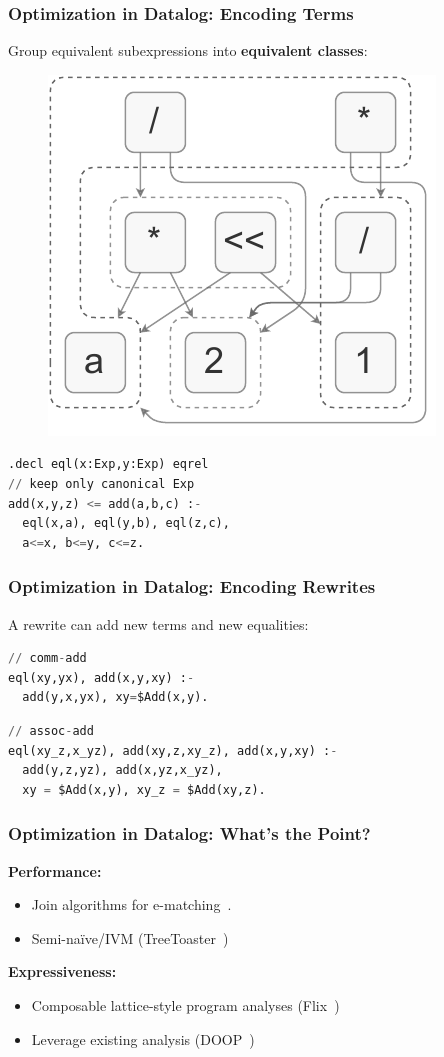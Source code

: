 \documentclass{beamer}
\begin{document}
\begin{frame}[fragile]
    \frametitle{Optimization in Datalog: Encoding Terms}
    Group equivalent subexpressions into \textbf{equivalent classes}:
    \begin{figure}
        \includegraphics[height=0.4\textheight]{egraph4.pdf}
    \end{figure}
    \pause
    \begin{lstlisting}[language=Python]
.decl eql(x:Exp,y:Exp) eqrel
// keep only canonical Exp
add(x,y,z) <= add(a,b,c) :-
  eql(x,a), eql(y,b), eql(z,c),
  a<=x, b<=y, c<=z.
    \end{lstlisting}
\end{frame}

\begin{frame}[fragile]
    \frametitle{Optimization in Datalog: Encoding Rewrites}
     A rewrite can add new terms and new equalities:

     \begin{lstlisting}[language=Python]
// comm-add
eql(xy,yx), add(x,y,xy) :- 
  add(y,x,yx), xy=$Add(x,y).
    \end{lstlisting}
    \pause
    \begin{lstlisting}[language=Python]
// assoc-add
eql(xy_z,x_yz), add(xy,z,xy_z), add(x,y,xy) :-
  add(y,z,yz), add(x,yz,x_yz),
  xy = $Add(x,y), xy_z = $Add(xy,z).
    \end{lstlisting}
\end{frame}

\begin{frame}
    \frametitle{Optimization in Datalog: What's the Point?}
    \textbf{Performance:}
    \begin{itemize}
        \item Join algorithms for e-matching~\cite{ZhangWWT22}.
        \item Semi-na\"ive/IVM (TreeToaster~\cite{BalakrishnanNKZ21})
    \end{itemize}
    \pause
    \textbf{Expressiveness:}
    \begin{itemize}
        \item Composable lattice-style program analyses (Flix~\cite{MadsenYL16})
        \item Leverage existing analysis (DOOP~\cite{BravenboerS09})
    \end{itemize}
\end{frame}
\end{document}

